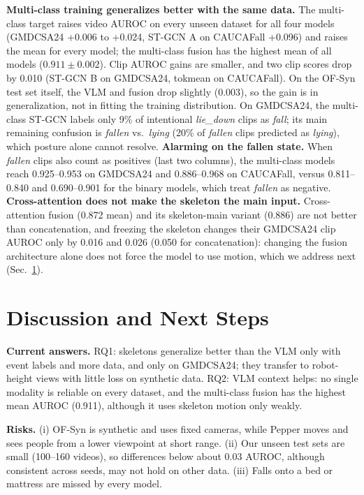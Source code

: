 \textbf{Multi-class training generalizes better with the same data.}
The multi-class target raises video AUROC on every unseen dataset for all four models (GMDCSA24 +0.006 to +0.024, ST-GCN A on CAUCAFall +0.096) and raises the mean for every model; the multi-class fusion has the highest mean of all models ($0.911\pm0.002$).
Clip AUROC gains are smaller, and two clip scores drop by 0.010 (ST-GCN B on GMDCSA24, tokmean on CAUCAFall). On the OF-Syn test set itself, the VLM and fusion drop slightly (0.003), so the gain is in generalization, not in fitting the training distribution.
On GMDCSA24, the multi-class ST-GCN labels only 9\% of intentional \emph{lie\_down} clips as \emph{fall}; its main remaining confusion is \emph{fallen} vs.\ \emph{lying} (20\% of \emph{fallen} clips predicted as \emph{lying}), which posture alone cannot resolve.
\textbf{Alarming on the fallen state.} When \emph{fallen} clips also count as positives (last two columns), the multi-class models reach 0.925--0.953 on GMDCSA24 and 0.886--0.968 on CAUCAFall, versus 0.811--0.840 and 0.690--0.901 for the binary models, which treat \emph{fallen} as negative.
\textbf{Cross-attention does not make the skeleton the main input.} Cross-attention fusion (0.872 mean) and its skeleton-main variant (0.886) are not better than concatenation, and freezing the skeleton changes their GMDCSA24 clip AUROC only by 0.016 and 0.026 (0.050 for concatenation): changing the fusion architecture alone does not force the model to use motion, which we address next (Sec.~\ref{sec:next}).

\section{Discussion and Next Steps}
\label{sec:next}

\textbf{Current answers.}
RQ1: skeletons generalize better than the VLM only with event labels and more data, and only on GMDCSA24; they transfer to robot-height views with little loss on synthetic data.
RQ2: VLM context helps: no single modality is reliable on every dataset, and the multi-class fusion has the highest mean AUROC (0.911), although it uses skeleton motion only weakly.

\textbf{Risks.}
(i) OF-Syn is synthetic and uses fixed cameras, while Pepper moves and sees people from a lower viewpoint at short range.
(ii) Our unseen test sets are small (100--160 videos), so differences below about 0.03 AUROC, although consistent across seeds, may not hold on other data.
(iii) Falls onto a bed or mattress are missed by every model.

